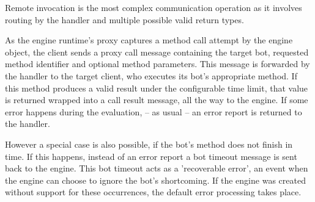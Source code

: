 \documentclass[11pt,a4paper,oneside]{report}
\begin{document}
		Remote invocation is the most complex communication operation as it involves routing by the handler and multiple possible valid return types.
		
		As the engine runtime's proxy captures a method call attempt by the engine object, the client sends a proxy call message containing the target bot, requested method identifier and optional method parameters. This message is forwarded by the handler to the target client, who executes its bot's appropriate method. If this method produces a valid result under the configurable time limit, that value is returned wrapped into a call result message, all the way to the engine. If some error happens during the evaluation, -- as usual -- an error report is returned to the handler.
		
		However a special case is also possible, if the bot's method does not finish in time. If this happens, instead of an error report a bot timeout message is sent back to the engine. This bot timeout acts as a 'recoverable error', an event when the engine can choose to ignore the bot's shortcoming. If the engine was created without support for these occurrences, the default error processing takes place.
\end{document}

